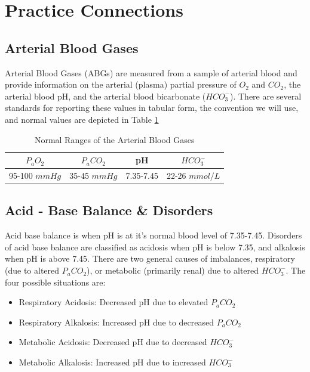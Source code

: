 \section{Practice Connections}

\subsection{Arterial Blood Gases}

Arterial Blood Gases (ABGs) are measured from a sample of arterial blood and provide information on the arterial (plasma) partial pressure of $O_2$ and $CO_2$, the arterial blood pH, and the arterial blood bicarbonate ($HCO_3^-$). There are several standards for reporting these values in tabular form, the convention we will use, and normal values are depicted in Table \ref{table:ABGs}

\begin{table}[h!]
\centering
\begin{tabular}{||c|c|c|c||} 
 \hline
 $P_aO_2$ & $P_aCO_2$ & pH & $HCO_3^-$ \\ [0.5ex] 
 \hline
 95-100 $mmHg$ & 35-45 $mmHg$ & 7.35-7.45 & 22-26 $mmol/L$ \\ [1ex] 
 \hline
\end{tabular}
\caption{Normal Ranges of the Arterial Blood Gases}
\label{table:ABGs}
\end{table}

\subsection{Acid - Base Balance \& Disorders}

Acid base balance is when pH is at it's normal blood level of 7.35-7.45. Disorders of acid base balance are classified as acidosis when pH is below 7.35, and alkalosis when pH is above 7.45. There are two general causes of imbalances, respiratory (due to altered $P_aCO_2$), or metabolic (primarily renal) due to altered $HCO_3^-$. The four possible situations are:
\vspace{3mm}
\begin{itemize}
    \item Respiratory Acidosis: Decreased pH due to elevated $P_aCO_2$
    \item Respiratory Alkalosis: Increased pH due to decreased $P_aCO_2$
    \item Metabolic Acidosis: Decreased pH due to decreased $HCO_3^-$
    \item Metabolic Alkalosis: Increased pH due to increased $HCO_3^-$
\end{itemize}
\vspace{3mm}

